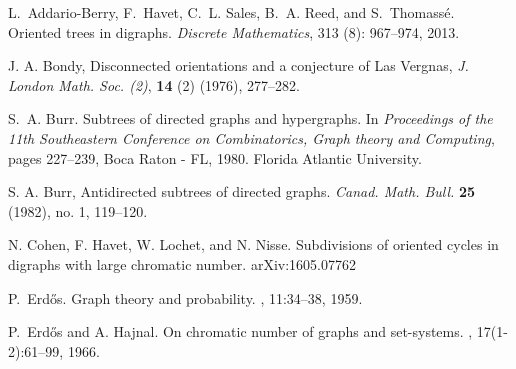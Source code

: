 \documentclass{endm}
\begin{document}
\begin{thebibliography}{10}\label{bibliography}



L.~Addario-Berry, F.~Havet, C.~L. Sales, B.~A. Reed, and S.~Thomass{\'e}.
\newblock Oriented trees in digraphs.
\newblock \emph{Discrete Mathematics}, 313 (8): 967--974,
  2013.



    J. A. Bondy, Disconnected orientations and a conjecture of Las Vergnas,
{\it J. London Math. Soc. (2)}, {\bf 14} (2) (1976), 277--282.

%



S.~A. Burr.
\newblock Subtrees of directed graphs and hypergraphs.
\newblock In \emph{Proceedings of the 11th Southeastern Conference on
  Combinatorics, Graph theory and Computing}, pages 227--239, Boca Raton - FL,
  1980. Florida Atlantic University.

 S. A. Burr,
Antidirected subtrees of directed graphs.
{\it Canad. Math. Bull.} {\bf 25} (1982), no. 1, 119--120.

N. Cohen, F. Havet, W. Lochet, and N. Nisse.
\newblock Subdivisions of oriented cycles in digraphs with large chromatic number.
\newblock arXiv:1605.07762

P.~Erd{\H{o}}s.
\newblock Graph theory and probability.
, 11:34--38, 1959.

P.~Erd{\H{o}}s and A. Hajnal.
\newblock On chromatic number of graphs and set-systems.
, 17(1-2):61--99, 1966.




\end{thebibliography}
\end{document}
